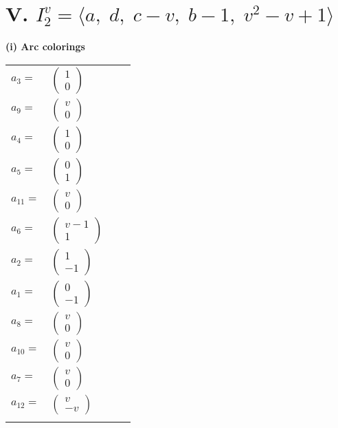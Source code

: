 \documentclass[1p]{elsarticle_modified}
\theoremstyle{definition}
\begin{document}
\centering \section*{V. $I^v_{2}= \langle a,\;d,\;c- v,\;b-1,\;v^2- v+1 \rangle$}
\flushleft \textbf{(i) Arc colorings}\\
\begin{tabular}{m{7pt} m{180pt} m{7pt} m{180pt} }
\flushright $a_{3}=$&$\begin{pmatrix}1\\0\end{pmatrix}$ \\
\flushright $a_{9}=$&$\begin{pmatrix}v\\0\end{pmatrix}$ \\
\flushright $a_{4}=$&$\begin{pmatrix}1\\0\end{pmatrix}$ \\
\flushright $a_{5}=$&$\begin{pmatrix}0\\1\end{pmatrix}$ \\
\flushright $a_{11}=$&$\begin{pmatrix}v\\0\end{pmatrix}$ \\
\flushright $a_{6}=$&$\begin{pmatrix}v-1\\1\end{pmatrix}$ \\
\flushright $a_{2}=$&$\begin{pmatrix}1\\-1\end{pmatrix}$ \\
\flushright $a_{1}=$&$\begin{pmatrix}0\\-1\end{pmatrix}$ \\
\flushright $a_{8}=$&$\begin{pmatrix}v\\0\end{pmatrix}$ \\
\flushright $a_{10}=$&$\begin{pmatrix}v\\0\end{pmatrix}$ \\
\flushright $a_{7}=$&$\begin{pmatrix}v\\0\end{pmatrix}$ \\
\flushright $a_{12}=$&$\begin{pmatrix}v\\- v\end{pmatrix}$\\&\end{tabular}
\end{document}
